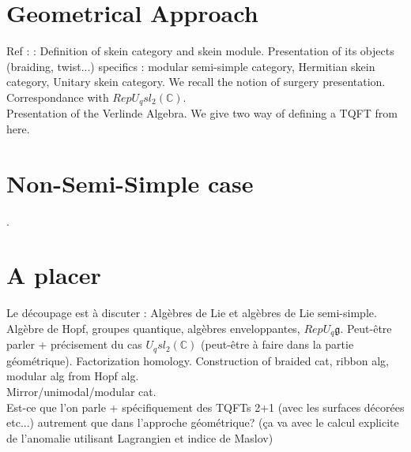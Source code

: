 \documentclass{article}
\begin{document}
\section{Geometrical Approach} Ref : \cite{Tur} \cite{BHMV} \cite{PS} : Definition of skein category and skein module. Presentation of its objects (braiding, twist...) specifics : modular semi-simple category, Hermitian skein category, Unitary skein category. We recall the notion of surgery presentation. Correspondance with $Rep U_q sl_2 (\mathbb{C})$.\\
Presentation of the Verlinde Algebra. We give two way of defining a TQFT from here.

\section{Non-Semi-Simple case}.
 
\section{A placer} Le découpage est à discuter : Algèbres de Lie et algèbres de Lie semi-simple. Algèbre de Hopf, groupes quantique, algèbres enveloppantes, $Rep U_q \mathfrak{g}$. Peut-être parler + précisement du cas $U_q sl_2 (\mathbb{C} )$ (peut-être à faire dans la partie géométrique). Factorization homology. Construction of braided cat, ribbon alg, modular alg from Hopf alg.\\
Mirror/unimodal/modular cat.\\
Est-ce que l'on parle + spécifiquement des TQFTs 2+1 (avec les surfaces décorées etc...) autrement que dans l'approche géométrique? (ça va avec le calcul explicite de l'anomalie utilisant Lagrangien et indice de Maslov)



\end{document}
